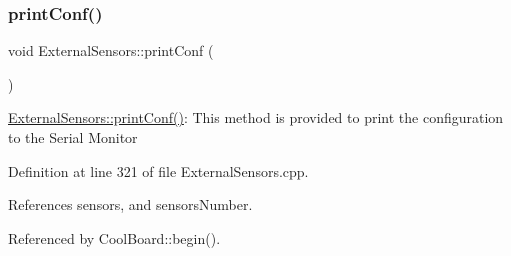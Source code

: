 \subsubsection{\texorpdfstring{print\+Conf()}{printConf()}}
{\footnotesize\ttfamily void External\+Sensors\+::print\+Conf (\begin{DoxyParamCaption}{ }\end{DoxyParamCaption})}

\hyperlink{classExternalSensors_a78c2bf55084435dd51d3c559b2d3c6f3}{External\+Sensors\+::print\+Conf()}\+: This method is provided to print the configuration to the Serial Monitor 

Definition at line 321 of file External\+Sensors.\+cpp.



References sensors, and sensors\+Number.



Referenced by Cool\+Board\+::begin().


